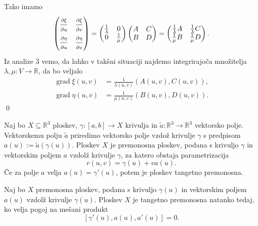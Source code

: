 Tako imamo \begin{equation*}
  \begin{pmatrix}
    \frac{ \strut\partial \xi }{ \strut\partial u }  & \frac{ \strut\partial \xi }{ \strut\partial v }  \\
    \frac{ \strut\partial \eta }{ \strut\partial u }  & \frac{ \strut\partial \eta }{ \strut\partial v } 
    \end{pmatrix} = \begin{pmatrix}
      \frac{1}{\lambda} & 0  \\ 0 & \frac{1}{\mu} 
      \end{pmatrix}\begin{pmatrix}
      A & C \\
      B & D
      \end{pmatrix} = \begin{pmatrix}
        \frac{1}{\lambda} A & \frac{1}{\lambda} C \\
        \frac{1}{\mu} B & \frac{1}{\mu} D
        \end{pmatrix}.
\end{equation*}  
Iz analize 3 vemo, da lahko v takšni situaciji najdemo integrirajoča množitelja $\lambda, \mu: V \to \mathbb{R}$, da bo veljalo \begin{align*}
  \operatorname{grad} \xi (u,v) &= \frac{1}{\lambda(u,v)}(A(u,v), C(u,v)), \\
  \operatorname{grad} \eta (u,v) &= \frac{1}{\mu(u,v)}(B(u,v), D(u,v)).
\end{align*}
\qed



\begin{definicija}
\label{def_premnosna_ploskev}
Naj bo $X \subseteq  \mathbb{R}^3$ ploskev, $\gamma: [a,b] \to X$ krivulja in $\tilde{a}: \mathbb{R}^3 \to \mathbb{R}^3$ vektorsko polje. 
Vektorskemu polju $\tilde{a}$ priredimo vektorsko polje vzdož krivulje $\gamma$ s predpisom $a(u) := \tilde{a}(\gamma(u))$. 
Ploskev $X$ je premonosna ploskev, podana s krivuljo $\gamma$ in vektorskim poljem $a$ vzdolž krivulje $\gamma$, za katero obstaja parametrizacija \begin{equation*}
r(u, v) = \gamma(u) + va(u).
\end{equation*}Če za polje $a$ velja $a(u) = \gamma'(u)$, potem je ploskev tangetno premonosna.
\end{definicija}


\begin{lema}
\label{lem_tangentno_premonosna_mesani_produkt}
Naj bo $X$ premonosna ploskev, podana s krivuljo $\gamma(u)$ in vektorskim poljem $a(u)$ vzdolž krivulje $\gamma(u)$. Ploskev $X$ je
tangetno premonosna natanko tedaj, ko velja pogoj na mešani produkt \begin{equation*}
\left[ \gamma'(u), a(u), a'(u) \right] = 0.
\end{equation*}  
\noindent
\end{lema}

